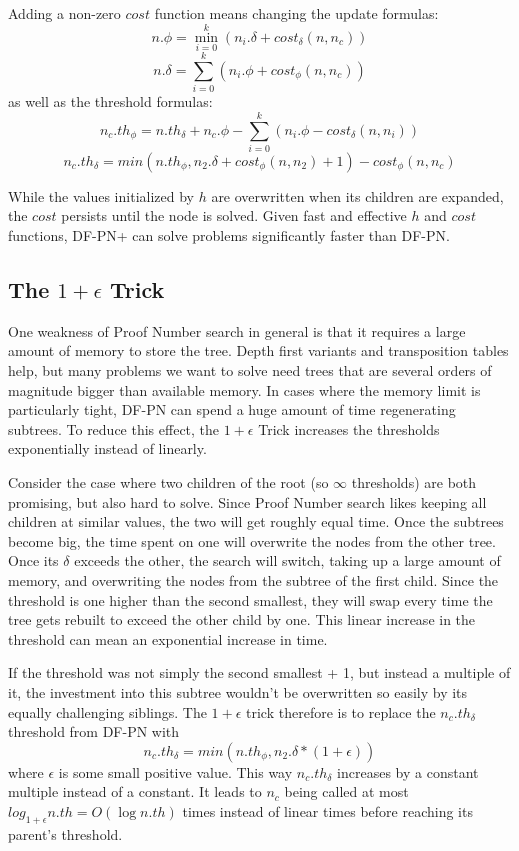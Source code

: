 Adding a non-zero $cost$ function means changing the update formulas:
$$ n.\phi = \displaystyle\min\limits_{i=0}^k (n_i.\delta + cost_\delta(n, n_c))$$ $$n.\delta = \displaystyle\sum\limits_{i=0}^k (n_i.\phi + cost_\phi(n, n_c))$$
as well as the threshold formulas:
$$n_c.th_\phi = n.th_\delta + n_c.\phi - \displaystyle\sum\limits_{i=0}^k (n_i.\phi - cost_\delta(n, n_i))$$ $$n_c.th_\delta = min(n.th_\phi, n_2.\delta + cost_\phi(n, n_2) + 1) - cost_\phi(n, n_c)$$

While the values initialized by $h$ are overwritten when its children are expanded, the $cost$ persists until the node is solved. Given fast and effective $h$ and $cost$ functions, DF-PN+ can solve problems significantly faster than DF-PN.

\subsection{The $1+\epsilon$ Trick} \label{sec:epstrick}

One weakness of Proof Number search in general is that it requires a large amount of memory to store the tree. Depth first variants and transposition tables help, but many problems we want to solve need trees that are several orders of magnitude bigger than available memory. In cases where the memory limit is particularly tight, DF-PN can spend a huge amount of time regenerating subtrees. To reduce this effect, the $1+\epsilon$ Trick \cite{pawlewicz2007epsilon} increases the thresholds exponentially instead of linearly.

Consider the case where two children of the root (so $\infty$ thresholds) are both promising, but also hard to solve. Since Proof Number search likes keeping all children at similar values, the two will get roughly equal time. Once the subtrees become big, the time spent on one will overwrite the nodes from the other tree. Once its $\delta$ exceeds the other, the search will switch, taking up a large amount of memory, and overwriting the nodes from the subtree of the first child. Since the threshold is one higher than the second smallest, they will swap every time the tree gets rebuilt to exceed the other child by one. This linear increase in the threshold can mean an exponential increase in time.

If the threshold was not simply the second smallest + 1, but instead a multiple of it, the investment into this subtree wouldn't be overwritten so easily by its equally challenging siblings. The $1 + \epsilon$ trick therefore is to replace the $n_c.th_\delta$ threshold from DF-PN with $$n_c.th_\delta = min(n.th_\phi, n_2.\delta*(1 + \epsilon))$$ where $\epsilon$ is some small positive value. This way $n_c.th_\delta$ increases by a constant multiple instead of a constant. It leads to $n_c$ being called at most $log_{1+\epsilon}n.th = O(\log n.th)$ times instead of linear times before reaching its parent's threshold.


